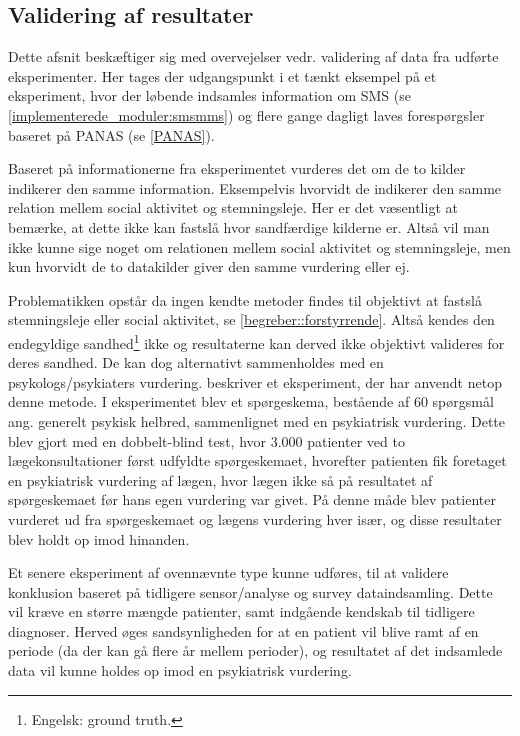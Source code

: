\subsection{Validering af resultater}\label{reflection:valid_resultater}
Dette afsnit beskæftiger sig med overvejelser vedr. validering af data fra udførte eksperimenter.
Her tages der udgangspunkt i et tænkt eksempel på et eksperiment, hvor der løbende indsamles information om SMS (se \cref{implementerede_moduler:smsmms}) og flere gange dagligt laves forespørgsler baseret på PANAS (se \cref{PANAS}).

Baseret på informationerne fra eksperimentet vurderes det om de to kilder indikerer den samme information.
Eksempelvis hvorvidt de indikerer den samme relation mellem social aktivitet og stemningsleje.
Her er det væsentligt at bemærke, at dette ikke kan fastslå hvor sandfærdige kilderne er.
Altså vil man ikke kunne sige noget om relationen mellem social aktivitet og stemningsleje, men kun hvorvidt de to datakilder giver den samme vurdering eller ej.

Problematikken opstår da ingen kendte metoder findes til objektivt at fastslå stemningsleje eller social aktivitet, se \cref{begreber::forstyrrende}.
Altså kendes den endegyldige sandhed\footnote{Engelsk: ground truth.} ikke og resultaterne kan derved ikke objektivt valideres for deres sandhed.
De kan dog alternativt sammenholdes med en psykologs/psykiaters vurdering.
 beskriver et eksperiment, der har anvendt netop denne metode.
I eksperimentet blev et spørgeskema, bestående af 60 spørgsmål ang. generelt psykisk helbred, sammenlignet med en psykiatrisk vurdering.
Dette blev gjort med en dobbelt-blind test, hvor 3.000 patienter ved to lægekonsultationer først udfyldte spørgeskemaet, hvorefter patienten fik foretaget en psykiatrisk vurdering af lægen, hvor lægen ikke så på resultatet af spørgeskemaet før hans egen vurdering var givet.
På denne måde blev patienter vurderet ud fra spørgeskemaet og lægens vurdering hver især, og disse resultater blev holdt op imod hinanden.

Et senere eksperiment af ovennævnte type kunne udføres, til at validere konklusion baseret på tidligere sensor/analyse og survey dataindsamling.
Dette vil kræve en større mængde patienter, samt indgående kendskab til tidligere diagnoser.
Herved øges sandsynligheden for at en patient vil blive ramt af en periode (da der kan gå flere år mellem perioder), og resultatet af det indsamlede data vil kunne holdes op imod en psykiatrisk vurdering.

